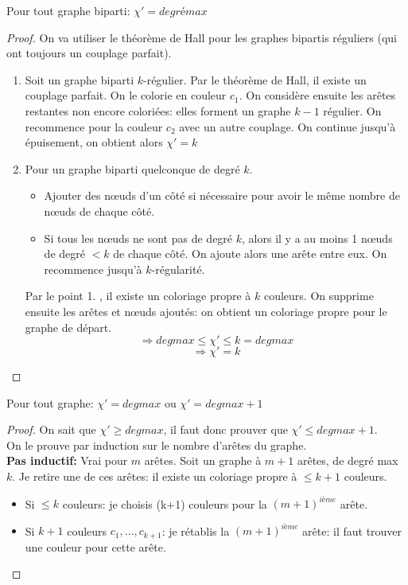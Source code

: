 \begin{mytheo}[König]
  Pour tout graphe biparti: $\chi '= degré max$
  \begin{proof}
    On va utiliser le théorème de Hall pour les graphes bipartis réguliers (qui ont toujours un couplage parfait).
    \begin{enumerate}
    
    
    \item Soit un graphe biparti $k$-régulier. Par le théorème de Hall, il existe un couplage parfait. On le colorie en couleur $c_{1}$. On considère ensuite les arêtes restantes non encore coloriées: elles forment un graphe $k-1$ régulier. On recommence pour la couleur $c_{2}$ avec un autre couplage. On continue jusqu'à épuisement, on obtient alors $\chi '=k$
    \item Pour un graphe biparti quelconque de degré $k$.
    \begin{itemize}
    \item Ajouter des nœuds d'un côté si nécessaire pour avoir le même nombre de nœuds de chaque côté.
    \item Si tous les nœuds ne sont pas de degré $k$, alors il y a au moins 1 nœuds de degré $<k$ de chaque côté. On ajoute alors une arête entre eux. On recommence jusqu'à $k$-régularité.
    \end{itemize}
    Par le point 1. , il existe un coloriage propre à $k$ couleurs. On supprime ensuite les arêtes et nœuds ajoutés: on obtient un coloriage propre pour le graphe de départ.
    $$\Rightarrow deg max \le \chi ' \le k=deg max$$
    $$\Rightarrow \chi ' = k$$
    \end{enumerate}
  \end{proof}
\end{mytheo}
\begin{mytheo} [Vizing]
Pour tout graphe: $\chi ' = deg max$ ou  $\chi ' = deg max + 1$
  \begin{proof} On sait que $\chi' \ge deg max$, il faut donc prouver que $\chi ' \le deg max + 1$.
  \\On le prouve par induction sur le nombre d'arêtes du graphe.
  \\ \textbf{Pas inductif:} Vrai pour $m$ arêtes. Soit un graphe à  $m+1$ arêtes, de degré max $k$. Je retire une de ces arêtes: il existe un coloriage propre à $\le k+1$ couleurs.
  \begin{itemize}
  \item Si $\le k$ couleurs: je choisis (k+1) couleurs pour la $(m+1)^{ième}$ arête.
  \item Si $k+1$ couleurs $c_{1},...,c_{k+1}$: je rétablis la $(m+1)^{ième}$ arête: il faut trouver une couleur pour cette arête.
  \end{itemize}

  \end{proof}
\end{mytheo}
\begin{myexem}



\end{myexem}
